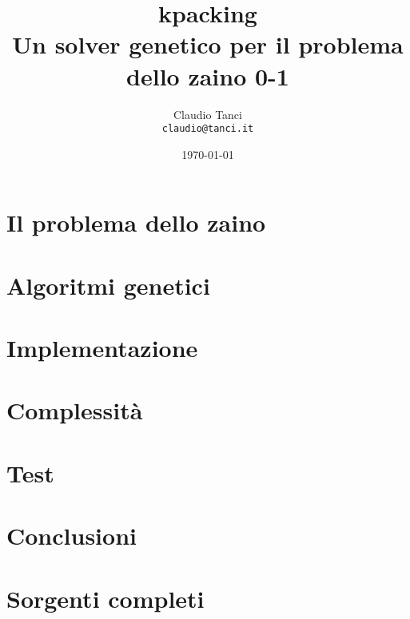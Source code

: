 \documentclass[11pt,a4paper]{article}
\title{kpacking\\
\Large Un solver genetico per il problema dello zaino 0-1\\[-0.8ex]}
\author{Claudio Tanci\\
\small \texttt{claudio@tanci.it}}
\date{\today}
\begin{document}
\maketitle

\begin{abstract}

\end{abstract} 

\section{Il problema dello zaino}

\section{Algoritmi genetici}

\section{Implementazione}

\section{Complessità}

\section{Test}

\section{Conclusioni}


\appendix
\section{Sorgenti completi}

\end{document}
